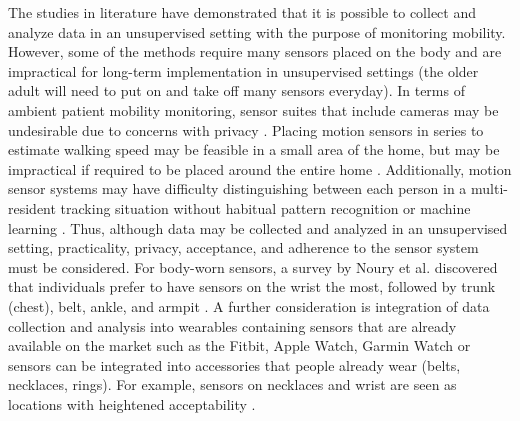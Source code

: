 The studies in literature have demonstrated that it is possible to collect and analyze data in an 
unsupervised setting with the purpose of monitoring mobility. However, some of the methods require 
many sensors placed on the body \cite{peraza_automatic_2021,botros_long-term_2019} and are impractical for long-term implementation in 
unsupervised settings (the older adult will need to put on and take off many sensors everyday). 
In terms of ambient patient mobility monitoring, sensor suites that include cameras may be undesirable 
due to concerns with privacy \cite{newland_continuous_2017}. Placing motion sensors in series to estimate walking speed may be 
feasible in a small area of the home, but may be impractical if required to be placed around the entire 
home \cite{hayes_unobtrusive_2009}. Additionally, motion sensor systems may have difficulty distinguishing between each person 
in a multi-resident tracking situation without habitual pattern recognition or machine learning \cite{wang_multi-person_2022}. 
Thus, although data may be collected and analyzed in an unsupervised setting, practicality, privacy, 
acceptance, and adherence to the sensor system must be considered. For body-worn sensors, a survey 
by Noury et al. discovered that individuals prefer to have sensors on the wrist the most, followed by 
trunk (chest), belt, ankle, and armpit \cite{noury_preliminary_2008}.  A further consideration is integration of data collection 
and analysis into wearables containing sensors that are already available on the market such as the 
Fitbit, Apple Watch, Garmin Watch or sensors can be integrated into accessories that people already 
wear (belts, necklaces, rings). For example, sensors on necklaces and wrist are seen as locations with 
heightened acceptability \cite{geraedts_validation_2015}.

